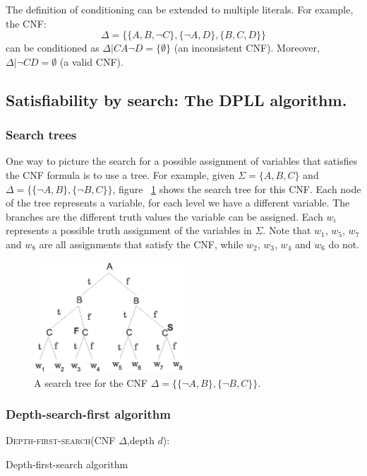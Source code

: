 \documentclass[12pt]{diicc}
\begin{document}
The definition of conditioning can be extended to multiple literals. For example, the CNF:
\[\Delta=\{\{A,B,\neg C\},\{\neg A,D\},\{B,C,D\}\}\]
can be conditioned as $\Delta |CA\neg D=\{\emptyset \}$ (an inconsistent CNF). Moreover, $\Delta |\neg CD=\emptyset$ (a valid CNF).

\subsection{Satisfiability by search: The DPLL algorithm.}

\subsubsection{Search trees}
One way to picture the search for a possible assignment of variables that satisfies the CNF formula is to use a tree. For example, given $\Sigma =\{A,B,C\}$ and $\Delta =\{\{\neg A,B\},\{\neg B,C\}\}$, figure ~\ref{fig:searchtree} shows the search tree for this CNF. Each node of the tree represents a variable, for each level we have a different variable. The branches are the different truth values the variable can be assigned. Each $w_{i}$ represents a possible truth assignment of the variables in $\Sigma$. Note that $w_{1}$, $w_{5}$, $w_{7}$ and $w_{8}$ are all assignments that satisfy the CNF, while $w_{2}$, $w_{3}$, $w_{4}$ and $w_{6}$ do not.

\begin{figure}[h!]
	\centering
		\includegraphics[width=0.5\textwidth]{searchtree}
	\caption{A search tree for the CNF $\Delta =\{\{\neg A,B\},\{\neg B,C\}\}$.}
	\label{fig:searchtree}
\end{figure}

\subsubsection{Depth-search-first algorithm}

\begin{algorithm}
\textsc{Depth-first-search}(CNF $\Delta$,depth $d$):\\
\caption{Depth-first-search algorithm\label{dpll}}
\end{algorithm}    
\end{document}
